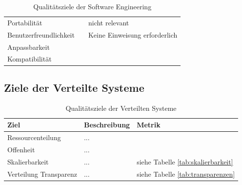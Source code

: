 \begin{table}[h!]
\begin{tabular}{p{4cm}|p{5cm}|p{5cm}|}
        & 
        \\
        \hline
        Portabilität & %
        & nicht relevant
        \\
        \hline
        Benutzerfreundlichkeit & %
        & Keine Einweisung erforderlich
        \\
        \hline
        Anpassbarkeit & 
        & 
        \\
        \hline
        Kompatibilität & 
        & 
        \\
        \hline
    \end{tabular}
    \caption{Qualitätsziele der Software Engineering}
    \label{tab:seziele}
\end{table}

\clearpage
\subsection{Ziele der Verteilte Systeme}
    \begin{table}[h!]
        \centering
        \begin{tabular}{p{4cm}|p{5cm}|p{5cm}|}
            \hline
            \textbf{Ziel} & \textbf{Beschreibung} & \textbf{Metrik} \\
            \hline
            Ressourcenteilung  & ...& \\
            Offenheit & ...& \\
            Skalierbarkeit & ...& siehe Tabelle \ref{tab:skalierbarkeit} \\
            Verteilung Transparenz & ...& siehe Tabelle \ref{tab:transparenzen} \\
            \hline
        \end{tabular}
        \caption{Qualitätsziele der Verteilten Systeme}
        \label{tab:vsziele}
    \end{table}
    
